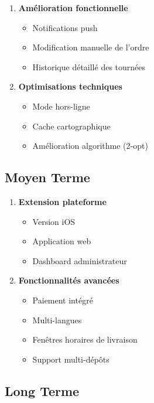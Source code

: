 \documentclass[12pt,a4paper]{report}
\begin{document}
\begin{enumerate}
    \item \textbf{Amélioration fonctionnelle}
    \begin{itemize}
        \item Notifications push
        \item Modification manuelle de l'ordre
        \item Historique détaillé des tournées
    \end{itemize}

    \item \textbf{Optimisations techniques}
    \begin{itemize}
        \item Mode hors-ligne
        \item Cache cartographique
        \item Amélioration algorithme (2-opt)
    \end{itemize}
\end{enumerate}

\subsection{Moyen Terme}

\begin{enumerate}
    \item \textbf{Extension plateforme}
    \begin{itemize}
        \item Version iOS
        \item Application web
        \item Dashboard administrateur
    \end{itemize}

    \item \textbf{Fonctionnalités avancées}
    \begin{itemize}
        \item Paiement intégré
        \item Multi-langues
        \item Fenêtres horaires de livraison
        \item Support multi-dépôts
    \end{itemize}
\end{enumerate}

\subsection{Long Terme}
\end{document}
